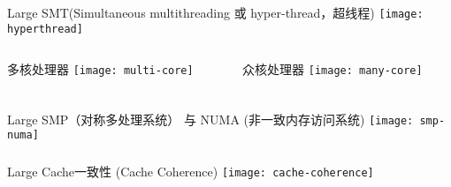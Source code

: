 \begin{frame}	
	\frametitle{}
	\centering
	Large 
	SMT(Simultaneous multithreading 或 hyper-thread，超线程)
	\texttt{[image: hyperthread]}
\end{frame}

\begin{frame}
	\begin{columns}
		\begin{column}{.5\textwidth}
			\Large
			多核处理器	
			\texttt{[image: multi-core]}
			
		\end{column}
		
		\begin{column}{.5\textwidth}
			\Large
			众核处理器
			\texttt{[image: many-core]}
			
		\end{column}
	\end{columns}
\end{frame}

\begin{frame}	
	\frametitle{}
	\centering
	Large 
	SMP（对称多处理系统） 与 NUMA (非一致内存访问系统)
	\texttt{[image: smp-numa]}
\end{frame}


\begin{frame}	
	\frametitle{}
	\centering
	Large 
	Cache一致性 (Cache Coherence)
	\texttt{[image: cache-coherence]}
\end{frame}












